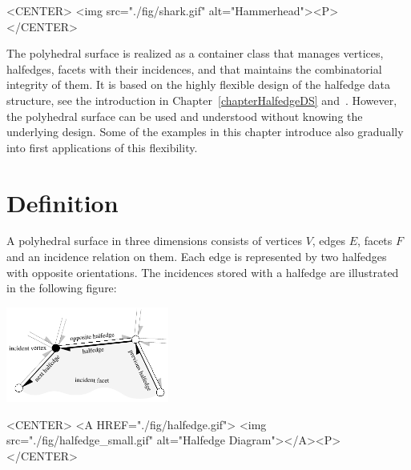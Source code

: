 \begin{ccHtmlOnly}
    <CENTER>
        <img src="./fig/shark.gif" alt="Hammerhead"><P>
    </CENTER>
\end{ccHtmlOnly}

The polyhedral surface is realized as a container class that manages
vertices, halfedges, facets with their incidences, and that maintains
the combinatorial integrity of them. It is based on the highly
flexible design of the halfedge data structure, see the introduction
in Chapter~\ref{chapterHalfedgeDS} and~\cite{k-ugpdd-99}. However, the
polyhedral surface can be used and understood without knowing the
underlying design. Some of the examples in this chapter introduce also
gradually into first applications of this flexibility.

\section{Definition}
  
A polyhedral surface  in
three dimensions consists of vertices $V$, edges $E$, facets $F$ and
an incidence relation on them.  Each edge is represented by two
halfedges with opposite orientations. The incidences stored with a
halfedge are illustrated in the following figure:

\begin{ccTexOnly}
    \vspace{-7mm}
    \begin{center}
      \parbox{0.4\textwidth}{%
          \includegraphics[width=0.4\textwidth]{Polyhedron/fig/halfedge}%
      }
    \end{center}
    \vspace{-5mm}
\end{ccTexOnly}

\begin{ccHtmlOnly}
    <CENTER>
    <A HREF="./fig/halfedge.gif">
        <img src="./fig/halfedge_small.gif" alt="Halfedge Diagram"></A><P>
    </CENTER>
\end{ccHtmlOnly}


